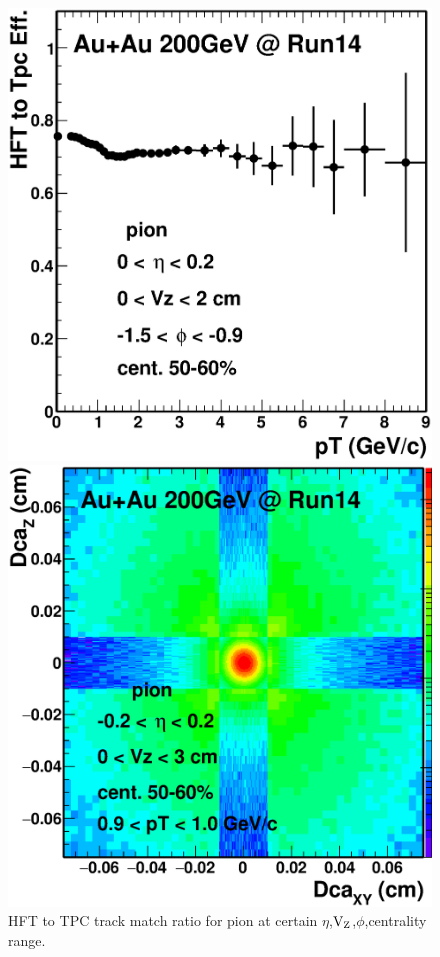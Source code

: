 \documentclass[a4paper]{article}
\begin{document}
\begin{figure}[htbp]
\begin{minipage}[htbp]{0.52\linewidth}
\centering
\includegraphics[width=1.0\textwidth,angle=0]{fig/hftRatioExample.eps}
\caption{ HFT to TPC track match ratio for pion at certain $\eta$,$\textup{V}_{\textup{Z}}$,$\phi$,centrality range. \label{hftRatioExample}}
\end{minipage}
\hfill
\begin{minipage}[htbp]{0.52\linewidth}
\centering
\includegraphics[width=1.0\textwidth,angle=0]{fig/DcaExample.eps} 

\end{minipage}
\end{figure}
\end{document}

